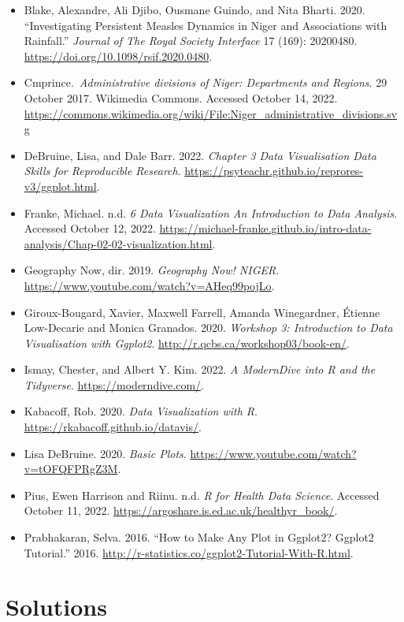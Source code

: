 \documentclass[
  letterpaper,
  DIV=11,
  numbers=noendperiod]{scrreprt}
\begin{document}
\begin{itemize}
\item
  Blake, Alexandre, Ali Djibo, Ousmane Guindo, and Nita Bharti. 2020.
  ``Investigating Persistent Measles Dynamics in Niger and Associations
  with Rainfall.'' \emph{Journal of The Royal Society Interface} 17
  (169): 20200480. \url{https://doi.org/10.1098/rsif.2020.0480}.
\item
  Cmprince.~\emph{Administrative divisions of Niger: Departments and
  Regions}. 29 October 2017. Wikimedia Commons. Accessed October 14,
  2022.
  \url{https://commons.wikimedia.org/wiki/File:Niger_administrative_divisions.svg}
\item
  DeBruine, Lisa, and Dale Barr. 2022. \emph{Chapter 3 Data
  Visualisation \textbar{} Data Skills for Reproducible Research}.
  \url{https://psyteachr.github.io/reprores-v3/ggplot.html}.
\item
  Franke, Michael. n.d. \emph{6 Data Visualization \textbar{} An
  Introduction to Data Analysis}. Accessed October 12, 2022.
  \url{https://michael-franke.github.io/intro-data-analysis/Chap-02-02-visualization.html}.
\item
  Geography Now, dir. 2019. \emph{Geography Now! NIGER}.
  \url{https://www.youtube.com/watch?v=AHeq99pojLo}.
\item
  Giroux-Bougard, Xavier, Maxwell Farrell, Amanda Winegardner, Étienne
  Low-Decarie and Monica Granados. 2020. \emph{Workshop 3: Introduction
  to Data Visualisation with Ggplot2}.
  \url{http://r.qcbs.ca/workshop03/book-en/}.
\item
  Ismay, Chester, and Albert Y. Kim. 2022. \emph{A ModernDive into R and
  the Tidyverse}. \url{https://moderndive.com/}.
\item
  Kabacoff, Rob. 2020. \emph{Data Visualization with R}.
  \url{https://rkabacoff.github.io/datavis/}.
\item
  Lisa DeBruine. 2020. \emph{Basic Plots}.
  \url{https://www.youtube.com/watch?v=tOFQFPRgZ3M}.
\item
  Pius, Ewen Harrison and Riinu. n.d. \emph{R for Health Data Science}.
  Accessed October 11, 2022.
  \url{https://argoshare.is.ed.ac.uk/healthyr_book/}.
\item
  Prabhakaran, Selva. 2016. ``How to Make Any Plot in Ggplot2?
  \textbar{} Ggplot2 Tutorial.'' 2016.
  \url{http://r-statistics.co/ggplot2-Tutorial-With-R.html}.
\end{itemize}

\section{Solutions}\label{solutions-9}
\end{document}
